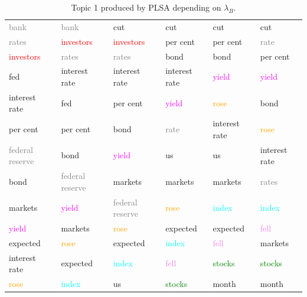 \documentclass[11pt,a4paper,english,oneside]{book}
\numberwithin{equation}{chapter}
\begin{document}
\begin{table}
\begin{tabular}{ p{3cm}  p{3cm}  p{3cm}  p{3cm}  p{3cm}  p{3cm}}
		 \textcolor{gray}{bank  }		& \textcolor{gray}{bank  }			& cut 							& cut 								&cut 							& cut \\
		 \textcolor{gray}{rates}		& \textcolor{red}{investors}		& \textcolor{red}{investors}	& per cent							&per cent						& \textcolor{gray}{rate} \\
		 \textcolor{red}{investors}		& \textcolor{gray}{rates}			& \textcolor{gray}{rates}		& bond								&bond 							& per cent\\
		 fed  							& interest rate 					& interest rate					& interest rate						&\textcolor{magenta}{yield}		& \textcolor{magenta}{yield} \\
		 interest  rate					& fed 								& per cent						& \textcolor{magenta}{yield}		&\textcolor{orange}{rose }		& bond \\
		 per cent 						& per cent 							& bond 							& \textcolor{gray}{rate}			&interest rate					& \textcolor{orange}{rose }\\
		 \textcolor{gray}{federal reserve }& bond 							& \textcolor{magenta}{yield}	& us								&us								& interest rate  \\
		 bond  							& \textcolor{gray}{federal reserve }& markets 						& markets							&markets						& \textcolor{gray}{rates}	 \\
		 markets  						& \textcolor{magenta}{yield}		& \textcolor{gray}{federal reserve }& \textcolor{orange}{rose }		&\textcolor{cyan}{index }		& \textcolor{cyan}{index } \\
		 \textcolor{magenta}{yield}		& markets 							& \textcolor{orange}{rose }		& expected							&expected 						& \textcolor{violet}{fell } \\
		 expected  						& \textcolor{orange}{rose }			& expected 						& \textcolor{cyan}{index }			&\textcolor{violet}{fell }		& markets \\
		 interest rate 					& expected							& \textcolor{cyan}{index }		& \textcolor{violet}{fell }			&\textcolor{green}{stocks}		& \textcolor{green}{stocks} \\
		 \textcolor{orange}{rose}  		& \textcolor{cyan}{index }			& us 							& \textcolor{green}{stocks}			&month 							& month \\		  
		\bottomrule %
	\end{tabular}
	\caption{Topic 1 produced by PLSA depending on $\lambda_B$.} %
	\label{tab:topics} %
\end{table}
\end{document}

